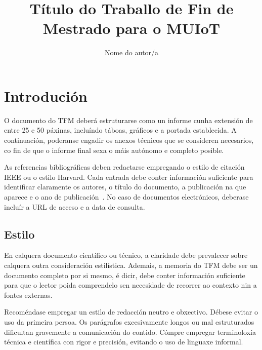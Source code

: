 \documentclass[%
    paper=A4,               %
    twoside,                %
    parskip=full,           %
    12pt,                   %
    titlepage=on,           %
    captions=tableabove,    %
]{book}                     %
\title{Título do Traballo de Fin de Mestrado para o MUIoT}
\author{Nome do autor/a}
\begin{document}
\maketitle
\clearemptydoublepage

\dedication{Dedicatoria}
\clearemptydoublepage

\tableofcontents
\clearemptydoublepage


\chapter{Introdución}
O documento do TFM deberá estruturarse como un informe cunha extensión
de entre 25 e 50 páxinas, incluíndo táboas, gráficos e a portada
establecida. A continuación, poderanse engadir os anexos técnicos que
se consideren necesarios, co fin de que o informe final sexa o máis
autónomo e completo posible.

As referencias bibliográficas deben redactarse empregando o estilo de
citación IEEE ou o estilo Harvard. Cada entrada debe conter
información suficiente para identificar claramente os autores, o
título do documento, a publicación na que aparece e o ano de
publicación~\cite{goossens1994latex}. No caso de documentos
electrónicos, deberase incluír a URL de acceso e a data de consulta.

\section{Estilo}
En calquera documento científico ou técnico, a claridade debe
prevalecer sobre calquera outra consideración estilística. Ademais, a
memoria do TFM debe ser un documento completo por si mesmo, é dicir,
debe conter información suficiente para que o lector poida comprendelo
sen necesidade de recorrer ao contexto nin a fontes externas.

Recoméndase empregar un estilo de redacción neutro e obxectivo. Débese
evitar o uso da primeira persoa. Os parágrafos excesivamente longos ou
mal estruturados dificultan gravemente a comunicación do
contido. Cómpre empregar terminoloxía técnica e científica con rigor e
precisión, evitando o uso de linguaxe informal.
\end{document}
